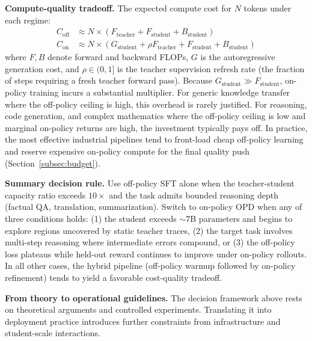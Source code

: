 \documentclass{article} %
\begin{document}
\textbf{Compute-quality tradeoff.} The expected compute cost for $N$ tokens under each regime:
\begin{align*}
    C_{\text{off}} &\approx N \times (F_{\text{teacher}} + F_{\text{student}} + B_{\text{student}}) \\
    C_{\text{on}} &\approx N \times \left( G_{\text{student}} + \rho F_{\text{teacher}} + F_{\text{student}} + B_{\text{student}} \right)
\end{align*}
where $F, B$ denote forward and backward FLOPs, $G$ is the autoregressive generation cost, and $\rho \in (0, 1]$ is the teacher supervision refresh rate (the fraction of steps requiring a fresh teacher forward pass). Because $G_{\text{student}} \gg F_{\text{student}}$, on-policy training incurs a substantial multiplier. For generic knowledge transfer where the off-policy ceiling is high, this overhead is rarely justified. For reasoning, code generation, and complex mathematics where the off-policy ceiling is low and marginal on-policy returns are high, the investment typically pays off. In practice, the most effective industrial pipelines tend to front-load cheap off-policy learning and reserve expensive on-policy compute for the final quality push (Section~\ref{subsec:budget}).

\textbf{Summary decision rule.} Use off-policy SFT alone when the teacher-student capacity ratio exceeds $10{\times}$ and the task admits bounded reasoning depth (factual QA, translation, summarization). Switch to on-policy OPD when any of three conditions holds: (1) the student exceeds $\sim$7B parameters and begins to explore regions uncovered by static teacher traces, (2) the target task involves multi-step reasoning where intermediate errors compound, or (3) the off-policy loss plateaus while held-out reward continues to improve under on-policy rollouts. In all other cases, the hybrid pipeline (off-policy warmup followed by on-policy refinement) tends to yield a favorable cost-quality tradeoff.

\textbf{From theory to operational guidelines.} The decision framework above rests on theoretical arguments and controlled experiments. Translating it into deployment practice introduces further constraints from infrastructure and student-scale interactions.
\end{document}
